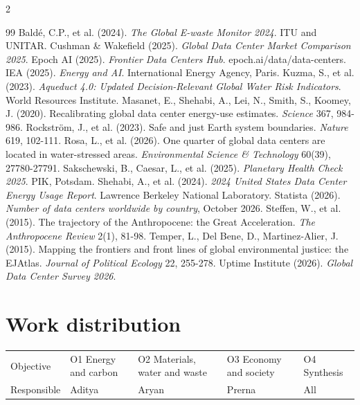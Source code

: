 \documentclass[10pt,a4paper]{article}
\begin{document}
{\footnotesize
\renewcommand{\refname}{\large 7\quad Bibliography}
\begin{multicols}{2}
\begin{thebibliography}{99}
 Bald\'e, C.P., et al. (2024). \emph{The Global E-waste Monitor 2024}. ITU and UNITAR.
 Cushman \& Wakefield (2025). \emph{Global Data Center Market Comparison 2025}.
 Epoch AI (2025). \emph{Frontier Data Centers Hub}. epoch.ai/data/data-centers.
 IEA (2025). \emph{Energy and AI}. International Energy Agency, Paris.
 Kuzma, S., et al. (2023). \emph{Aqueduct 4.0: Updated Decision-Relevant Global Water Risk Indicators}. World Resources Institute.
 Masanet, E., Shehabi, A., Lei, N., Smith, S., Koomey, J. (2020). Recalibrating global data center energy-use estimates. \emph{Science} 367, 984-986.
 Rockstr\"om, J., et al. (2023). Safe and just Earth system boundaries. \emph{Nature} 619, 102-111.
 Rosa, L., et al. (2026). One quarter of global data centers are located in water-stressed areas. \emph{Environmental Science \& Technology} 60(39), 27780-27791.
 Sakschewski, B., Caesar, L., et al. (2025). \emph{Planetary Health Check 2025}. PIK, Potsdam.
 Shehabi, A., et al. (2024). \emph{2024 United States Data Center Energy Usage Report}. Lawrence Berkeley National Laboratory.
 Statista (2026). \emph{Number of data centers worldwide by country}, October 2026.
 Steffen, W., et al. (2015). The trajectory of the Anthropocene: the Great Acceleration. \emph{The Anthropocene Review} 2(1), 81-98.
 Temper, L., Del Bene, D., Martinez-Alier, J. (2015). Mapping the frontiers and front lines of global environmental justice: the EJAtlas. \emph{Journal of Political Ecology} 22, 255-278.
 Uptime Institute (2026). \emph{Global Data Center Survey 2026}.
\end{thebibliography}
\end{multicols}}

\section*{Work distribution}
{\small
\setlength{\tabcolsep}{4pt}
\begin{tabular}{@{}lllll@{}}
\toprule
Objective & O1 Energy and carbon & O2 Materials, water and waste & O3 Economy and society & O4 Synthesis \\
Responsible & Aditya & Aryan & Prerna & All \\
\bottomrule
\end{tabular}}
\end{document}
